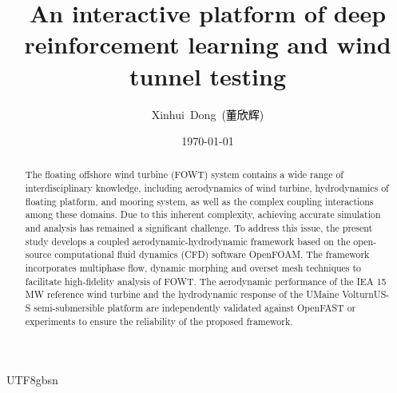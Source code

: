 \documentclass[%
 aip,
 amsmath,amssymb,
 reprint,%
]{revtex4-1}
\newcommand{\chiefeditor}[1]{\textcolor{black}{#1}}
\begin{document}
\UseRawInputEncoding
\begin{CJK*}{UTF8}{gbsn}


\title{An interactive platform of deep reinforcement learning and wind tunnel testing}

\author{Xinhui~Dong~\chiefeditor{(董欣辉)}}


\date{\today}

\begin{abstract}
The floating offshore wind turbine (FOWT) system contains a wide range of interdisciplinary knowledge, including aerodynamics of wind turbine, hydrodynamics of floating platform, and mooring system, as well as the complex coupling interactions among these domains. Due to this inherent complexity, achieving accurate simulation and analysis has remained a significant challenge. To address this issue, the present study develops a coupled aerodynamic-hydrodynamic framework based on the open-source computational fluid dynamics (CFD) software OpenFOAM. The framework incorporates multiphase flow, dynamic morphing and overset mesh techniques to facilitate high-fidelity analysis of FOWT. The aerodynamic performance of the IEA 15 MW reference wind turbine and the hydrodynamic response of the UMaine VolturnUS-S semi-submersible platform are independently validated against OpenFAST or experiments to ensure the reliability of the proposed framework. 


\end{abstract}
\end{CJK*}
\end{document}
